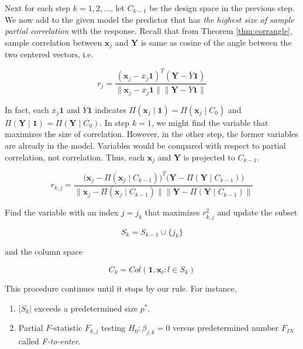 \documentclass[]{book}
\providecommand{\tightlist}{%
  \setlength{\itemsep}{0pt}\setlength{\parskip}{0pt}}
\theoremstyle{definition}
\theoremstyle{definition}
\theoremstyle{definition}
\theoremstyle{remark}
\begin{document}
Next for each step \(k = 1, 2, \ldots\), let \(C_{k - 1}\) be the design space in the previous step. We now add to the given model the predictor that has \emph{the highest size of sample partial correlation} with the response. Recall that from Theorem \ref{thm:corrangle}, sample correlation between \(\mathbf{x}_j\) and \(\mathbf{Y}\) is same as cosine of the angle between the two centered vectors, i.e.

\[r_j = \frac{(\mathbf{x}_j - \overline{x}_j \mathbf{1})^T (\mathbf{Y} - \overline{Y} \mathbf{1})}{\lVert \mathbf{x}_j - \overline{x}_j \mathbf{1} \rVert \lVert \mathbf{Y} - \overline{Y} \mathbf{1} \rVert}\]

In fact, each \(\overline{x}_j \mathbf{1}\) and \(\overline{Y} \mathbf{1}\) indicates \(\Pi(\mathbf{x}_j \mid \mathbf{1}) = \Pi(\mathbf{x}_j \mid C_0)\) and \(\Pi(\mathbf{Y} \mid \mathbf{1}) = \Pi(\mathbf{Y} \mid C_0)\). In step \(k = 1\), we might find the variable that maximizes the size of correlation. However, in the other step, the former variables are already in the model. Variables would be compared with respect to partial correlation, not correlation. Thus, each \(\mathbf{x}_j\) and \(\mathbf{Y}\) is projected to \(C_{k - 1}\).

\begin{equation}
  r_{k, j} = \frac{\Big(\mathbf{x}_j - \Pi(\mathbf{x}_j \mid C_{k - 1})\Big)^T \Big(\mathbf{Y} - \Pi(\mathbf{Y} \mid C_{k - 1})\Big)}{\lVert \mathbf{x}_j - \Pi(\mathbf{x}_j \mid C_{k - 1}) \rVert \lVert \mathbf{Y} - \Pi(\mathbf{Y} \mid C_{k - 1}) \rVert}
  \label{eq:parcor}
\end{equation}

Find the variable with an index \(j = j_k\) that maximizes \(r_{k, j}^2\) and update the subset

\[S_k = S_{k - 1} \cup \{ j_k \}\]

and the column space

\[C_k = Col(\mathbf{1}, \mathbf{x}_l : l \in S_k)\]

This procedure continues until it stops by our rule. For instance,

\begin{enumerate}
\def\labelenumi{\arabic{enumi}.}
\tightlist
\item
  \(\lvert S_k \rvert\) exceeds a predetermined size \(p^{\ast}\).
\item
  Partial \(F\)-statistic \(F_{k,j}\) testing \(H_0: \beta_{j,k} = 0\) versus predetermined number \(F_{IN}\) called \emph{F-to-enter}.
\end{enumerate}
\end{document}
